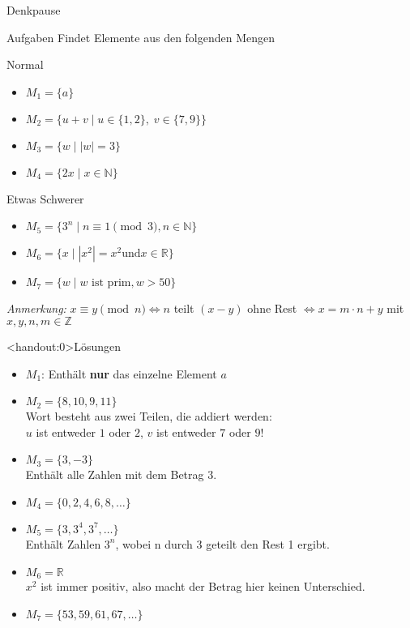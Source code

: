{
\begin{frame}[fragile]{Denkpause}
    \footnotesize
    \begin{alertblock}{Aufgaben}
        Findet Elemente aus den folgenden Mengen
    \end{alertblock}
    \begin{block}{Normal}
        \begin{itemize}
            \item $M_1 = \{a\}$
            \item $M_2 = \{u+v \mid u\in\{1,2\},\;v\in\{7,9\}\}$
            \item $M_3 = \{w \mid |w| = 3\}$
            \item $M_4 = \{2x \mid x\in \mathbb N\}$
        \end{itemize}
    \end{block}
    \begin{block}{Etwas Schwerer}
        \begin{itemize}
            \item $M_5 = \{3^n \mid n \equiv 1 \pmod 3, n\in\mathbb{N}\}$
            \item $M_6 = \{x \mid |x^2| = x^2 \text{und} x\in \mathbb{R}\}$
            \item $M_7 = \{w \mid w \text{ ist prim}, w > 50\}$
        \end{itemize}
    \end{block}
    \emph{Anmerkung:} $x \equiv y \pmod n \iff n$ teilt $(x-y)$ ohne Rest $\iff x = m \cdot n + y$ mit $x,y,n,m \in \mathbb{Z}$
\end{frame}
}

{
\begin{frame}<handout:0>{Lösungen}
    \begin{itemize}[<+- | alert@+>]
        \item
              $M_1$: Enthält \textbf{nur} das einzelne Element $a$
        \item
              $M_2 = \{8, 10, 9, 11\}$\\
              Wort besteht aus zwei Teilen, die addiert werden:\\ $u$ ist entweder $1$ oder $2$, $v$ ist entweder $7$ oder $9$!
        \item
              $M_3 = \{3, -3\}$\\
              Enthält alle Zahlen mit dem Betrag $3$.
        \item $M_4 = \{0, 2, 4, 6, 8, \dots \}$
        \item $M_5 = \{3, 3^4, 3^7, \dots\}$\\
              Enthält Zahlen $3^n$, wobei n durch 3 geteilt den Rest 1 ergibt.
        \item
              $M_6 = \mathbb{R}$\\
              $x^2$ ist immer positiv, also macht der Betrag hier keinen Unterschied.
        \item
              $M_7 = \{53, 59, 61, 67, \dots\}$
    \end{itemize}
\end{frame}
}
